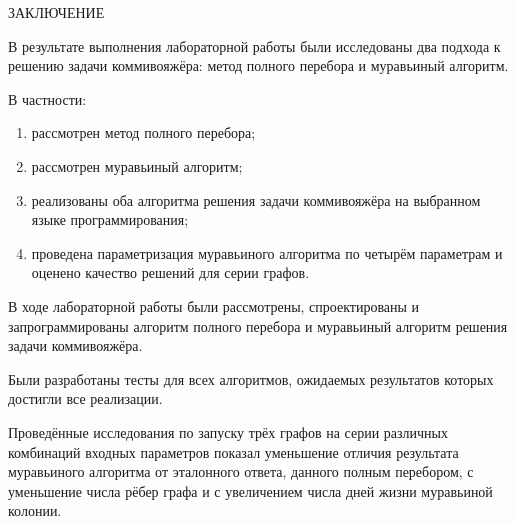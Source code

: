 \begin{center}
    \MakeUppercase{\large Заключение}
\end{center}

В результате выполнения лабораторной работы были исследованы два подхода к решению задачи коммивояжёра: метод полного перебора и муравьиный алгоритм.

\vspace{0.25cm}
В частности:

\begin{enumerate}[label=\arabic*)]

\item рассмотрен метод полного перебора;

\item рассмотрен муравьиный алгоритм;

\item реализованы оба алгоритма решения задачи коммивояжёра на выбранном языке программирования;

\item проведена параметризация муравьиного алгоритма по четырём параметрам и оценено качество решений для серии графов.

\end{enumerate}

В ходе лабораторной работы были рассмотрены, спроектированы и запрограммированы алгоритм полного перебора и муравьиный алгоритм решения задачи коммивояжёра.

Были разработаны тесты для всех алгоритмов, ожидаемых результатов которых достигли все реализации.

Проведённые исследования по запуску трёх графов на серии различных комбинаций входных параметров показал уменьшение отличия результата муравьиного алгоритма от эталонного ответа, данного полным перебором, с уменьшение числа рёбер графа и с увеличением числа дней жизни муравьиной колонии.

\newpage